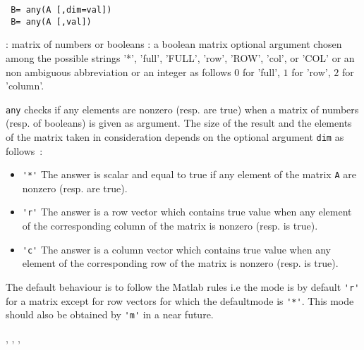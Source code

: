\begin{mandesc}
\end{mandesc}
\begin{calling_sequence}
\begin{verbatim}
 B= any(A [,dim=val])
 B= any(A [,val])
\end{verbatim}
\end{calling_sequence}
\begin{parameters}
  \begin{varlist}
    :  matrix of numbers or booleans 
     : a boolean matrix 
     optional argument chosen among the possible strings '*', 
    'full', 'FULL', 'row', 'ROW', 'col', or 'COL'  or an non ambiguous abbreviation or an 
    integer as follows $0$ for 'full', $1$ for 'row', $2$ for 'column'.
  \end{varlist}
\end{parameters}

\begin{mandescription}
  \verb!any! checks if any elements are nonzero (resp. are true) when a matrix of numbers (resp. of booleans) 
  is given as argument. The size of the result and the elements of the matrix taken in consideration depends 
  on the optional argument \verb!dim! as follows~:
  \begin{itemize}
  \item \verb!'*'! The answer is scalar and equal to true if any element of the matrix \verb!A!
    are nonzero (resp. are true).
  \item \verb!'r'! The answer is a row vector which contains true value when any element of 
    the corresponding column of the matrix is nonzero (resp. is true). 
  \item \verb!'c'! The answer is a column vector which contains true value when any element of 
    the corresponding row of the matrix is nonzero (resp. is true).
  \end{itemize}
  The default behaviour is to follow the Matlab rules i.e the mode is by default \verb!'r'! 
  for a matrix except for row vectors for which the defaultmode is \verb!'*'!. 
  This mode should also be obtained by \verb!'m'! in a near future. 
\end{mandescription}
\begin{manseealso}
  , , , 
\end{manseealso}

